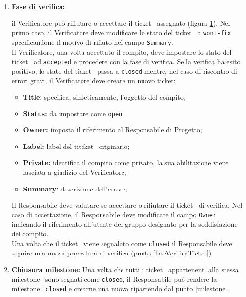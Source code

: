 {{\begin{enumerate}
		\newpage

		\begin{center}
			\begin{figure}[h!]
				\centering
				\label{VerTk}
				\texttt{[image: \\docsImg 4.pdf]}
				\caption{Modello per la creazione e gestione delle verifiche.}	
			\end{figure}
		\end{center}	

		\item \textbf{Fase di verifica:} \label{faseVerificaTicket} {
			il Verificatore può rifiutare o accettare il ticket\g~ assegnato (figura \ref{VerTk}).
			Nel primo caso, il Verificatore deve modificare lo stato del ticket\g~ a \texttt{wont-fix} specificandone il motivo di rifiuto nel campo \texttt{Summary}.\\
			Il Verificatore, una volta accettato il compito, deve impostare lo stato del ticket\g~ ad \texttt{accepted} e procedere con la fase di verifica.
			Se la verifica ha esito positivo, lo stato del ticket\g~ passa a \texttt{closed} mentre, nel caso di riscontro di errori gravi, il Verificatore deve creare un nuovo ticket\g :
			\begin{itemize}
				\item \textbf{Title:} specifica, sinteticamente, l'oggetto del compito;
				\item \textbf{Status:} da impostare come \texttt{open};
				\item \textbf{Owner:} imposta il riferimento al Responsabile di Progetto;
				\item \textbf{Label:} label del titcket\g~ originario;
				\item \textbf{Private:} identifica il compito come privato, la sua abilitazione viene lasciata a giudizio del Verificatore;
				\item \textbf{Summary:} descrizione dell'errore;
			\end{itemize}
			Il Responsabile deve valutare se accettare o rifiutare il ticket\g~ di verifica. Nel caso di accettazione, il Responsabile deve modificare il campo \texttt{Owner} indicando il riferimento all'utente del gruppo designato per la soddisfazione del compito.\\
			Una volta che il ticket\g~ viene segnalato come \texttt{closed} il Responsabile deve seguire una nuova procedura di verifica (punto \ref{faseVerificaTicket}).
		}

		\item \textbf{Chiusura milestone\g :} \label{closeMS} {
			Una volta che tutti i ticket\g~ appartenenti alla stessa milestone\g~ sono segnati come \texttt{closed}, il Responsabile può rendere la milestone\g~ \texttt{closed} e crearne una nuova ripartendo dal punto \ref{milestone}.
		}


\end{enumerate}}}
